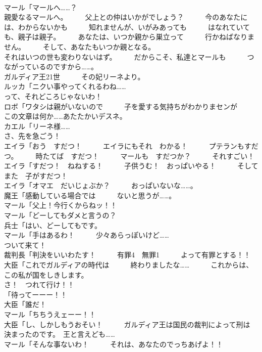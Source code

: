 \documentclass[8pt]{extreport}
\begin{document}
\begin{CJK}{UTF8}{min}
\\	マール「マールへ……？	
\\	親愛なるマールへ。　　　父上との仲はいかがでしょう？　　　今のあなたには、わからないかも　　　知れませんが、いがみあっても　　　はなれていても、親子は親子。　　　あなたは、いつか親から巣立って　　　行かねばなりません。　　　そして、あなたもいつか親となる。	
\\	それはいつの世も変わりないはず。　　　だからこそ、私達とマールも　　　つながっているのですから……。	
\\	ガルディア王21世　　　その妃リーネより。	
\\	ルッカ「ニクい事やってくれるわね……	
\\	って、それどころじゃないわ！	
\\	ロボ「ワタシは親がいないので　　　子を愛する気持ちがわかりまセンが　　　この文章は何か……あたたかいデスネ。	
\\	カエル「リーネ様……	
\\	さ、先を急ごう！	
\\	エイラ「おう　すだつ！　　　エイラにもそれ　わかる！　　　プテランもすだつ。　　　時たてば　すだつ！　　　マールも　すだつか？　　　それすごい！	
\\	エイラ「すだつ！　ねねする！　　　子供うむ！　おっぱいやる！　　　そしてまた　子がすだつ！	
\\	エイラ「オマエ　だいじょぶか？　　　おっぱいないな……。	
\\	魔王「感動している場合では　　　ないと思うが……。	
\\	マール「父上！今行くからねッ！！	
\\	マール「どーしてもダメと言うの？	
\\	兵士「はい、どーしてもです。	
\\	マール「手はあるわ！　　　少々あらっぽいけど……	
\\	ついて来て！	
\\	裁判長「判決をいいわたす！　　　有罪4　無罪1　　　よって有罪とする！！	
\\	大臣「これでガルディアの時代は　　　終わりましたな……　　　これからは、この私が国をしきします。	
\\	さ！　つれて行け！！	
\\	「待ってーーー！！	
\\	大臣「誰だ！	
\\	マール「ちちうえェーー！！	
\\	大臣「し、しかしもうおそい！　　　ガルディア王は国民の裁判によって刑は　　　決まったのです。　王と言えども……	
\\	マール「そんな事ないわ！　　　それは、あなたのでっちあげよ！！	

\end{CJK}
\end{document}
